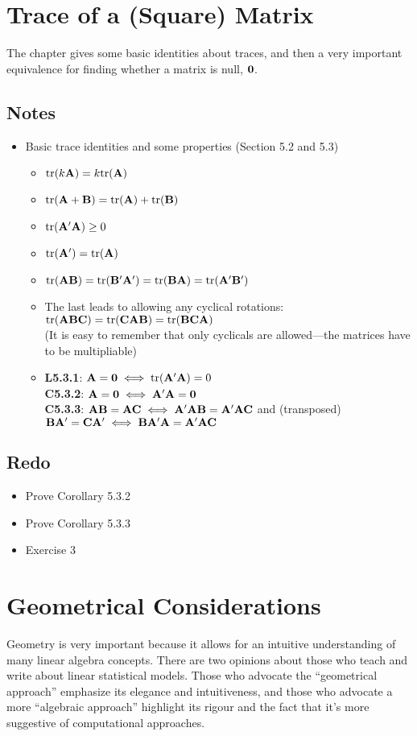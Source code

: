 \documentclass[a4paper, oneside]{book}
\begin{document}
\chapter{Trace of a (Square) Matrix}

The chapter gives some basic identities about traces, and then a very important equivalence for finding whether a matrix is null, $\mathbf{0}$.

\section*{Notes}
\begin{itemize}
\item Basic trace identities and some properties (Section 5.2 and 5.3)
	\begin{itemize}
	\item $\text{tr}(k\mathbf{A}) = k \text{tr}(\mathbf{A})$
	\item $\text{tr}(\mathbf{A+B}) = \text{tr}(\mathbf{A})+\text{tr}(\mathbf{B})$
	\item $\text{tr}(\mathbf{A'A})\geq 0$
	\item $\text{tr}(\mathbf{A}') = \text{tr}(\mathbf{A})$
	\item $\text{tr}(\mathbf{AB}) = \text{tr}(\mathbf{B'A'}) = \text{tr}(\mathbf{BA}) =  \text{tr}(\mathbf{A'B'})$
	\item The last leads to allowing any cyclical rotations: $\text{tr}(\mathbf{ABC}) = \text{tr}(\mathbf{CAB}) = \text{tr}(\mathbf{BCA})$\\
	(It is easy to remember that only cyclicals are allowed\----the matrices have to be multipliable)
	\item \textbf{L5.3.1}: $\mathbf{A} = \mathbf{0} \iff \text{tr}(\mathbf{A'A})=0$ \\
	\textbf{C5.3.2}: $\mathbf{A=0} \iff \mathbf{A'A=0}$ \\
	\textbf{C5.3.3}: $\mathbf{AB=AC} \iff \mathbf{A'AB=A'AC}$ and (transposed) $\mathbf{BA'=CA'} \iff \mathbf{BA'A=A'AC}$ 
	\end{itemize}
\end{itemize}

\section*{Redo}
\begin{itemize}
\item Prove Corollary 5.3.2
\item Prove Corollary 5.3.3
\item Exercise 3
\end{itemize}

\chapter{Geometrical Considerations}
Geometry is very important because it allows for an intuitive understanding of many linear algebra concepts. There are two opinions about those who teach and write about linear statistical models. Those who advocate the ``geometrical approach'' emphasize its elegance and intuitiveness, and those who advocate a more ``algebraic approach'' highlight its rigour and the fact that it's more suggestive of computational approaches.
\end{document}
